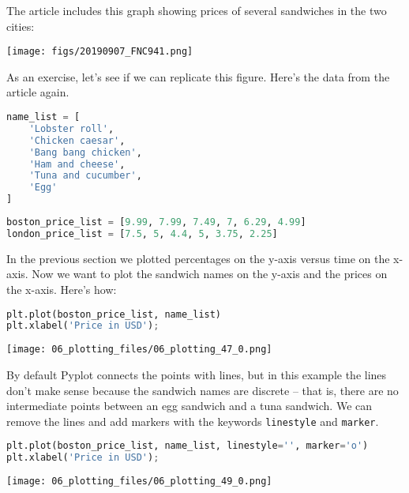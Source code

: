 \pagebreak

The article includes this graph showing prices of several sandwiches in
the two cities:

\texttt{[image: figs/20190907\_FNC941.png]}

As an exercise, let's see if we can replicate this figure. Here's the
data from the article again.

\begin{lstlisting}[language=Python,style=source]
name_list = [
    'Lobster roll',
    'Chicken caesar',
    'Bang bang chicken',
    'Ham and cheese',
    'Tuna and cucumber',
    'Egg'
]
\end{lstlisting}

\begin{lstlisting}[language=Python,style=source]
boston_price_list = [9.99, 7.99, 7.49, 7, 6.29, 4.99]
london_price_list = [7.5, 5, 4.4, 5, 3.75, 2.25]
\end{lstlisting}

In the previous section we plotted percentages on the y-axis versus time
on the x-axis. Now we want to plot the sandwich names on the y-axis and
the prices on the x-axis. Here's how:

\begin{lstlisting}[language=Python,style=source]
plt.plot(boston_price_list, name_list)
plt.xlabel('Price in USD');
\end{lstlisting}

\begin{center}
\texttt{[image: 06\_plotting\_files/06\_plotting\_47\_0.png]}
\end{center}

By default Pyplot connects the points with lines, but in this example
the lines don't make sense because the sandwich names are discrete --
that is, there are no intermediate points between an egg sandwich and a
tuna sandwich. We can remove the lines and add markers with the keywords
\passthrough{\lstinline!linestyle!} and
\passthrough{\lstinline!marker!}.

\begin{lstlisting}[language=Python,style=source]
plt.plot(boston_price_list, name_list, linestyle='', marker='o')
plt.xlabel('Price in USD');
\end{lstlisting}

\begin{center}
\texttt{[image: 06\_plotting\_files/06\_plotting\_49\_0.png]}
\end{center}

